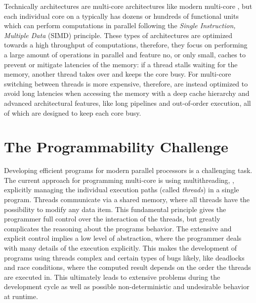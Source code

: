 Technically \GPU architectures are multi-core architectures like modern multi-core \CPUs, but each individual core on a \GPU typically has dozens or hundreds of functional units which can perform computations in parallel following the \emph{Single Instruction, Multiple Data} (SIMD) principle.
These types of architectures are optimized towards a high throughput of computations, therefore, they focus on performing a large amount of operations in parallel and feature no, or only small, caches to prevent or mitigate latencies of the memory:
if a thread stalls waiting for the memory, another thread takes over and keeps the core busy.
For multi-core \CPUs switching between threads is more expensive, therefore, \CPUs are instead optimized to avoid long latencies when accessing the memory with a deep cache hierarchy and advanced architectural features, like long pipelines and out-of-order execution, all of which are designed to keep each core busy.

\pagebreak
\section{The Programmability Challenge}

Developing efficient programs for modern parallel processors is a challenging task.
The current approach for programming multi-core \CPUs is using multithreading, \ie, explicitly managing the individual execution paths (called \emph{threads}) in a single program.
Threads communicate via a shared memory, where all threads have the possibility to modify any data item.
This fundamental principle gives the programmer full control over the interaction of the threads, but greatly complicates the reasoning about the programs behavior.
The extensive and explicit control implies a low level of abstraction, where the programmer deals with many details of the execution explicitly.
This makes the development of programs using threads complex and certain types of bugs likely, like deadlocks and race conditions, where the computed result depends on the order the threads are executed in.
This ultimately leads to extensive problems during the development cycle as well as possible non-deterministic and undesirable behavior at runtime.

